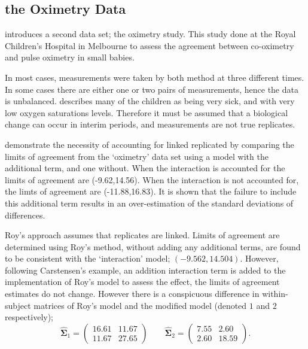 \documentclass[12pt, a4paper]{report}
\theoremstyle{plain}
\theoremstyle{definition}
\theoremstyle{remark}
\begin{document}
\subsection{the Oximetry Data}
\citet{BXC2008} introduces a second data set; the oximetry study. This study done at the Royal Children's Hospital in
Melbourne to assess the agreement between co-oximetry and pulse oximetry in small babies.

In most cases, measurements were taken by both method at three different times. In some cases there are either one or two pairs of measurements, hence the data is unbalanced. \citet{BXC2008} describes many of the children as being very sick, and with very low oxygen saturations levels. Therefore it must be assumed that a biological change can occur in interim periods, and measurements are not true replicates.



\citet{BXC2008} demonstrate the necessity of accounting for linked replicated by comparing the limits of agreement from the `oximetry' data set using a model with the additional term, and one without. When the interaction is accounted for the limits of agreement are (-9.62,14.56). When the interaction is not accounted for, the limts of agreement are (-11.88,16.83). It is shown that the failure to include this additional term results in an over-estimation of the standard deviations of differences.

Roy's approach assumes that replicates are linked. Limits of agreement are determined using Roy's method, without adding any additional terms, are found to be consistent with the `interaction' model; $(-9.562, 14.504 )$.  However, following Carstensen's example, an addition interaction term is added to the implementation of Roy's model to assess the effect, the limits of agreement estimates do not change. However there is a conspicuous difference in within-subject matrices of Roy's model and the modified model (denoted $1$ and $2$ respectively);
\begin{equation}
\hat{\boldsymbol{\Sigma}}_{1}= \left(\begin{array}{cc}
16.61 &	11.67\\
11.67 & 27.65 \end{array}\right) \qquad
\boldsymbol{\hat{\Sigma}}_{2}= \left( \begin{array}{cc}
7.55 & 2.60 \\
2.60 & 18.59 \end{array} \right). 
\end{equation}
\end{document}
